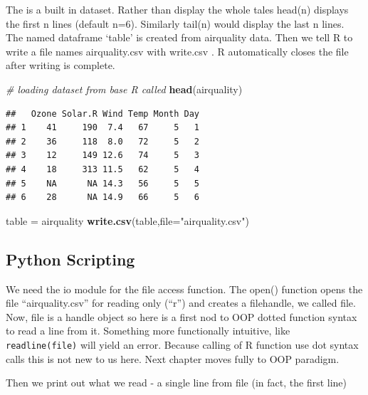 \documentclass[]{book}
\newenvironment{Shaded}{\begin{snugshade}}{\end{snugshade}}
\newcommand{\KeywordTok}[1]{\textcolor[rgb]{0.13,0.29,0.53}{\textbf{#1}}}
\newcommand{\DataTypeTok}[1]{\textcolor[rgb]{0.13,0.29,0.53}{#1}}
\newcommand{\StringTok}[1]{\textcolor[rgb]{0.31,0.60,0.02}{#1}}
\newcommand{\CommentTok}[1]{\textcolor[rgb]{0.56,0.35,0.01}{\textit{#1}}}
\newcommand{\NormalTok}[1]{#1}
\theoremstyle{definition}
\theoremstyle{definition}
\theoremstyle{definition}
\theoremstyle{remark}
\begin{document}
The   is a built in dataset. Rather
than display the whole tales head(n)  displays the first
n lines (default n=6). Similarly tail(n)  would display
the last n lines. The named dataframe `table' is created from airquality
data. Then we tell R to write a file names airquality.csv with write.csv
. R automatically closes the file after writing is
complete.

\begin{Shaded}
\begin{Highlighting}[]
\CommentTok{# loading dataset from base R called }
\KeywordTok{head}\NormalTok{(airquality)}
\end{Highlighting}
\end{Shaded}

\begin{verbatim}
##   Ozone Solar.R Wind Temp Month Day
## 1    41     190  7.4   67     5   1
## 2    36     118  8.0   72     5   2
## 3    12     149 12.6   74     5   3
## 4    18     313 11.5   62     5   4
## 5    NA      NA 14.3   56     5   5
## 6    28      NA 14.9   66     5   6
\end{verbatim}

\begin{Shaded}
\begin{Highlighting}[]
\NormalTok{table =}\StringTok{ }\NormalTok{airquality}
\KeywordTok{write.csv}\NormalTok{(table,}\DataTypeTok{file=}\StringTok{"airquality.csv"}\NormalTok{)}
\end{Highlighting}
\end{Shaded}

\subsection{Python Scripting}\label{python-scripting-3}

We need the io module for the file access function. The open() function
opens the file ``airquality.csv'' for reading only (``r'') and creates a
filehandle, we called file. Now, file is a handle object so here is a
first nod to OOP dotted function syntax to read a line from it.
Something more functionally intuitive, like \texttt{readline(file)} will
yield an error. Because calling of R function use dot syntax calls this
is not new to us here. Next chapter moves fully to OOP paradigm.

Then we print out what we read - a single line from file (in fact, the
first line)
\end{document}
